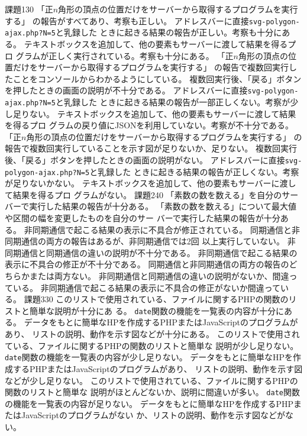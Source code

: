 \documentclass[a4j]{jreport}
\begin{document}
{}
{
{課題1}{30}
{
  {「正$n$角形の頂点の位置だけをサーバーから取得するプログラムを実行する」
	の報告がすべてあり、考察も正しい。}
  {アドレスバーに直接\Verb+svg-polygon-ajax.php?N=5+と乳録した
	ときに起きる結果の報告が正しい。考察も十分にある。}
	{テキストボックスを追加して、他の要素もサーバーに渡して結果を得るプロ
	グラムが正しく実行されている。考察も十分にある。}
}
{
  {「正$n$角形の頂点の位置だけをサーバーから取得するプログラムを実行する」
	の報告で複数回実行したことをコンソールからわかるようにしている。}
	{複数回実行後、「戻る」ボタンを押したときの画面の説明が不十分である。}
  {アドレスバーに直接\Verb+svg-polygon-ajax.php?N=5+と乳録した
	ときに起きる結果の報告が一部正しくない。考察が少し足りない。}
	{テキストボックスを追加して、他の要素もサーバーに渡して結果を得るプロ
	グラムの戻り値にJSONを利用していない。考察が不十分である。}
}
{
  {「正$n$角形の頂点の位置だけをサーバーから取得するプログラムを実行する」
	の報告で複数回実行していることを示す図が足りないか、足りない。}
	{複数回実行後、「戻る」ボタンを押したときの画面の説明がない。}
  {アドレスバーに直接\Verb+svg-polygon-ajax.php?N=5+と乳録した
	ときに起きる結果の報告が正しくない。考察が足りないかない。}
	{テキストボックスを追加して、他の要素もサーバーに渡して結果を得るプロ
	グラムがない。}
}
{\ResultA}
{課題2}{40}
{
  {「素数の数を数える」を自分のサーバーで実行した結果の報告が十分ある。}
  {「素数の数を数える」について最大値や区間の幅を変更したものを自分のサー
	バーで実行した結果の報告が十分ある。}
	{非同期通信で起こる結果の表示に不具合が修正されている。}
	}
{
	{同期通信と非同期通信の両方の報告はあるが、非同期通信では2回
				以上実行していない。}
  {非同期通信と同期通信の違いの説明が不十分である。}
	{非同期通信で起こる結果の表示に不具合の修正が不十分である。}
}
{
	{同期通信と非同期通信の両方の報告のどちらかまたは両方ない。}
  {非同期通信と同期通信の違いの説明がないか、間違っている。}
	{非同期通信で起こる結果の表示に不具合の修正がないか間違っている。}
	}
	{\ResultEI}
{課題3}{30}
{
  {このリストで使用されている、ファイルに関するPHPの関数のリストと簡単な説明が十分にあ
	る。}
	{\texttt{date}関数の機能を一覧表の内容が十分にある。}
	{データをもとに簡単なHPを作成するPHPまたはJavaScriptのプログラムがあり、
	リストの説明、動作を示す図などが十分にある。}
}
{
  {このリストで使用されている、ファイルに関するPHPの関数のリストと簡単な
	説明が少し足りない。}
	{\texttt{date}関数の機能を一覧表の内容が少し足りない。}
	{データをもとに簡単なHPを作成するPHPまたはJavaScriptのプログラムがあり、
	リストの説明、動作を示す図などが少し足りない。}
}
{
  {このリストで使用されている、ファイルに関するPHPの関数のリストと簡単な
	説明がほとんどないか、説明に間違いが多い。}
	{\texttt{date}関数の機能を一覧表の内容が足りない。}
	{データをもとに簡単なHPを作成するPHPまたはJavaScriptのプログラムがない
	か、リストの説明、動作を示す図などがない。}
}
{\ResultA}
}
\end{document}
